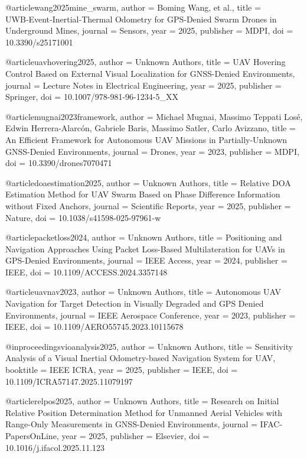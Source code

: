 @article{wang2025mine_swarm,
  author = {Boming Wang, et al.},
  title = {UWB‑Event‑Inertial‑Thermal Odometry for GPS‑Denied Swarm Drones in Underground Mines},
  journal = {Sensors},
  year = {2025},
  publisher = {MDPI},
  doi = {10.3390/s25171001}
}

@article{uavhovering2025,
  author = {Unknown Authors},
  title = {UAV Hovering Control Based on External Visual Localization for GNSS-Denied Environments},
  journal = {Lecture Notes in Electrical Engineering},
  year = {2025},
  publisher = {Springer},
  doi = {10.1007/978-981-96-1234-5_XX}
}

@article{mugnai2023framework,
  author = {Michael Mugnai, Massimo Teppati Losé, Edwin Herrera-Alarcón, Gabriele Baris, Massimo Satler, Carlo Avizzano},
  title = {An Efficient Framework for Autonomous UAV Missions in Partially-Unknown GNSS-Denied Environments},
  journal = {Drones},
  year = {2023},
  publisher = {MDPI},
  doi = {10.3390/drones7070471}
}

@article{doaestimation2025,
  author = {Unknown Authors},
  title = {Relative DOA Estimation Method for UAV Swarm Based on Phase Difference Information without Fixed Anchors},
  journal = {Scientific Reports},
  year = {2025},
  publisher = {Nature},
  doi = {10.1038/s41598-025-97961-w}
}

@article{packetloss2024,
  author = {Unknown Authors},
  title = {Positioning and Navigation Approaches Using Packet Loss-Based Multilateration for UAVs in GPS-Denied Environments},
  journal = {IEEE Access},
  year = {2024},
  publisher = {IEEE},
  doi = {10.1109/ACCESS.2024.3357148}
}

@article{uavnav2023,
  author = {Unknown Authors},
  title = {Autonomous UAV Navigation for Target Detection in Visually Degraded and GPS Denied Environments},
  journal = {IEEE Aerospace Conference},
  year = {2023},
  publisher = {IEEE},
  doi = {10.1109/AERO55745.2023.10115678}
}

@inproceedings{vioanalysis2025,
  author = {Unknown Authors},
  title = {Sensitivity Analysis of a Visual Inertial Odometry-based Navigation System for UAV},
  booktitle = {IEEE ICRA},
  year = {2025},
  publisher = {IEEE},
  doi = {10.1109/ICRA57147.2025.11079197}
}

@article{relpos2025,
  author = {Unknown Authors},
  title = {Research on Initial Relative Position Determination Method for Unmanned Aerial Vehicles with Range-Only Measurements in GNSS-Denied Environments},
  journal = {IFAC-PapersOnLine},
  year = {2025},
  publisher = {Elsevier},
  doi = {10.1016/j.ifacol.2025.11.123}
}

